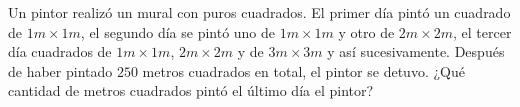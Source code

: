 Un pintor realizó un mural con puros cuadrados. El primer día pintó un cuadrado de $1m \times  1m$, el segundo día se pintó uno de $1m\times 1m$ y otro de $2m\times 2m$, el tercer día cuadrados de $1m\times 1m$, $2m\times 2m$ y de $3m\times 3m$ y así sucesivamente. Después de haber pintado $250$ metros cuadrados en total, el pintor se detuvo. ¿Qué cantidad de metros cuadrados pintó el último día el pintor?